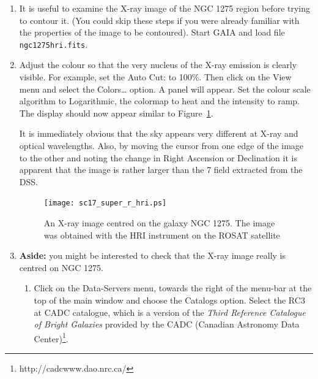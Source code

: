 \documentclass[twoside,11pt]{article}
\newcommand{\arcmin} {\raisebox{-0.5ex}{$^{'}$} }
\newcommand{\htmladdnormallinkfoot}[2]{#1\footnote{#2}}
\begin{document}
\begin{enumerate}

  \item It is useful to examine the X-ray image of the NGC 1275 region
   before trying to contour it.  (You could skip these steps if you
   were already familiar with the properties of the image to be contoured).
   Start GAIA and load file {\tt ngc1275hri.fits}.

  \item Adjust the colour so that the very nucleus of the X-ray emission
   is clearly visible.  For example, set the {\sf Auto Cut:} to 100\%.
   Then click on the {\sf View} menu and select the {\sf
   Colors\ldots} option.  A panel will appear.  Set the colour scale
   algorithm to {\sf Logarithmic}, the colormap to {\sf heat} and the
   intensity to {\sf ramp}.  The display should now appear similar to
   Figure~\ref{SUPER_R_HRI}.

   It is immediately obvious that the sky appears very different at X-ray
   and optical wavelengths.  Also, by moving the cursor from one edge of
   the image to the other and noting the change in Right Ascension or
   Declination it is apparent that the image is rather larger than the
   7\arcmin field extracted from the DSS.

  \begin{figure}[htbp]
     \centering 
     \texttt{[image: sc17\_super\_r\_hri.ps]}
     \begin{quote}
     \caption[An X-ray image of NGC 1275]
      {An X-ray image centred on the galaxy NGC 1275.  The image was
      obtained with the HRI instrument on the ROSAT satellite
     \label{SUPER_R_HRI} }
     \end{quote}
  \end{figure}

  \item {\bf Aside:} you might be interested to check that the X-ray
   image really is centred on NGC 1275.  

  \begin{enumerate}

    \item Click on the {\sf Data-Servers} menu, towards the right of the
     menu-bar at the top of the main window and choose the {\sf Catalogs}
     option.  Select the {\sf RC3 at CADC} catalogue, which is a version
     of the {\it Third Reference Catalogue of Bright Galaxies}\/\cite{RC3} 
     provided by the
     \htmladdnormallinkfoot{CADC (Canadian Astronomy Data Center)}
     {http://cadcwww.dao.nrc.ca/}.


\end{enumerate}
\end{enumerate}
\end{document}
